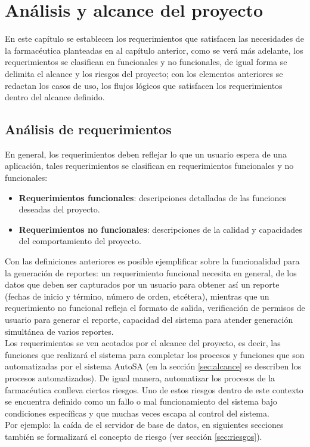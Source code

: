 \chapter{Análisis y alcance del proyecto}\label{cap2}

En este capítulo se establecen los requerimientos que satisfacen las necesidades de la farmacéutica planteadas en al capítulo anterior, como se verá más adelante, los requerimientos se clasifican en funcionales y no funcionales, de igual forma se delimita el alcance y los riesgos del proyecto; con los elementos anteriores se redactan los casos de uso, los flujos lógicos que satisfacen los requerimientos dentro del alcance definido.


\section{Análisis de requerimientos}\label{sec:req-ana}
En general, los requerimientos deben reflejar lo que un usuario espera de una aplicación, tales requerimientos se clasifican en requerimientos funcionales y no funcionales:
\begin{itemize}
\item \textbf{Requerimientos funcionales}: descripciones detalladas de las funciones deseadas del proyecto\cite{WileyBegSE}.
\item \textbf{Requerimientos no funcionales}: descripciones de la calidad y capacidades del comportamiento del proyecto\cite{WileyBegSE}.
\end{itemize}
Con las definiciones anteriores es posible ejemplificar sobre la funcionalidad para la generación de reportes: un requerimiento funcional necesita en general, de los datos que deben ser capturados por un usuario para obtener así un reporte (fechas de inicio y término, número de orden, etcétera), mientras que un requerimiento no funcional refleja el formato de salida, verificación de permisos de usuario para generar el reporte,  capacidad del sistema para atender generación simultánea de varios reportes.\\
Los requerimientos se ven acotados por el alcance del proyecto, es decir, las funciones que realizará el sistema para completar los procesos y funciones que son automatizadas por el sistema AutoSA\cite{WileyBegSE} (en la sección \ref{sec:alcance} se describen los procesos automatizados). De igual manera, automatizar los procesos de la farmacéutica conlleva ciertos riesgos. Uno de estos riesgos dentro de este contexto se encuentra definido como un fallo o mal funcionamiento del sistema bajo condiciones específicas y que muchas veces escapa al control del sistema.\\
Por ejemplo: la caída de el servidor de base de datos, en siguientes secciones también se formalizará el concepto de riesgo (ver sección \ref{sec:riesgos}).



